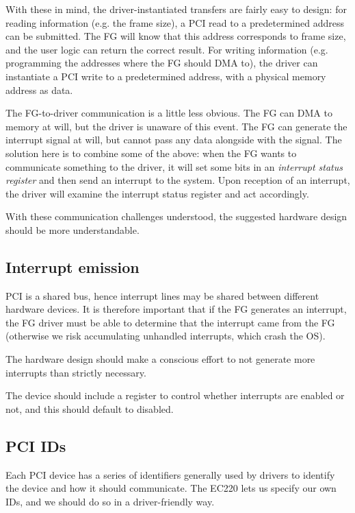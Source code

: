 \documentclass[12pt]{article}
\begin{document}
With these in mind, the driver-instantiated transfers are fairly easy to design: for reading information (e.g. the frame size), a PCI read to a predetermined address can be submitted. The FG will know that this address corresponds to frame size, and the user logic can return the correct result. For writing information (e.g. programming the addresses where the FG should DMA to), the driver can instantiate a PCI write to a predetermined address, with a physical memory address as data.

The FG-to-driver communication is a little less obvious. The FG can DMA to memory at will, but the driver is unaware of this event. The FG can generate the interrupt signal at will, but cannot pass any data alongside with the signal. The solution here is to combine some of the above: when the FG wants to communicate something to the driver, it will set some bits in an \textit{interrupt status register} and then send an interrupt to the system. Upon reception of an interrupt, the driver will examine the interrupt status register and act accordingly.

With these communication challenges understood, the suggested hardware design should be more understandable.

\subsection{Interrupt emission}

PCI is a shared bus, hence interrupt lines may be shared between different hardware devices. It is therefore important that if the FG generates an interrupt, the FG driver must be able to determine that the interrupt came from the FG (otherwise we risk accumulating unhandled interrupts, which crash the OS).

The hardware design should make a conscious effort to not generate more interrupts than strictly necessary.

The device should include a register to control whether interrupts are enabled or not, and this should default to disabled.

\subsection{PCI IDs}

Each PCI device has a series of identifiers generally used by drivers to identify the device and how it should communicate. The EC220 lets us specify our own IDs, and we should do so in a driver-friendly way.
\end{document}
